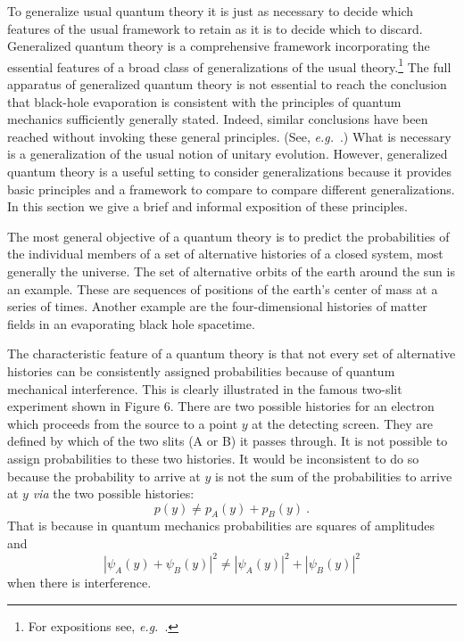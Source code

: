 To generalize usual quantum theory it is just as necessary to decide
which features of the usual framework to retain as it is to decide which
to discard.  Generalized quantum theory is a comprehensive
framework incorporating the essential features of a broad class
of generalizations of the usual theory.\footnote{For 
expositions see, {\it e.g.}~\cite{Ish94,Har95c}.}  The full apparatus of generalized
quantum theory is not essential to reach the conclusion that black-hole
evaporation is consistent with the principles of quantum mechanics
sufficiently generally stated.  Indeed, similar conclusions have been
reached without invoking these general principles. (See,
{\it e.g.}~\cite{Wal94}.) What is necessary is a generalization of the usual
notion of unitary evolution.  However, generalized quantum theory is a useful
setting to consider generalizations 
because it provides basic principles and
a framework to compare to compare different  generalizations. In this section
we give a brief and informal exposition of these principles.

The most general objective of a quantum theory is to predict the
probabilities of the individual members of a set of 
alternative histories of a closed system, most generally the universe.
The set of alternative orbits of the earth around the sun 
is an example.  These are sequences of positions of the
earth's center of mass at a series of times. Another example are the
four-dimensional histories of matter fields in an evaporating black hole
spacetime.

The characteristic feature of a quantum theory is that not
every set of alternative histories can be consistently assigned
probabilities because of quantum mechanical interference.  This is
clearly illustrated in the famous two-slit experiment shown in Figure 6.  
There are two
possible histories for an electron which proceeds from the source to a
point $y$ at the detecting screen. They are
 defined by which of the two slits (A
or B) it passes through.  It is not possible to assign
probabilities to these two histories.  It would be inconsistent to do so
because the probability to arrive at $y$ is not the sum of the
probabilities to arrive at $y$ {\it via} the two possible histories:
\begin{equation}
p(y) \not= p_A(y) + p_B(y)\ .
\label{fiveone}
\end{equation}
That is because in quantum mechanics probabilities are squares of
amplitudes and
\begin{equation}
\left|\psi_A(y) + \psi_B(y)\right|^2 \not= \left|\psi_A(y)\right|^2 +
\left|\psi_B(y)\right|^2
\label{fivetwo}
\end{equation}
when there is interference.

